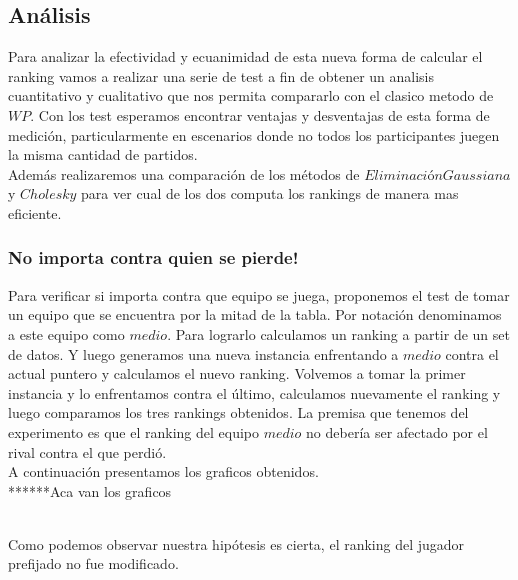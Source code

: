 \subsection{Análisis}

Para analizar la efectividad y ecuanimidad de esta nueva forma de calcular el ranking vamos a realizar una serie de test a fin de obtener un analisis cuantitativo y cualitativo que nos permita compararlo con el clasico metodo de $WP$.
Con los test esperamos encontrar ventajas y desventajas de esta forma de medición, particularmente en escenarios donde no todos los participantes juegen la misma cantidad de partidos.
\\
Además realizaremos una comparación de los métodos de $Eliminación Gaussiana$ y $Cholesky$ para ver cual de los dos computa los rankings de manera mas eficiente.


\subsubsection{No importa contra quien se pierde!}

Para verificar si importa contra que equipo se juega, proponemos el test de tomar un equipo que se encuentra por la mitad de la tabla. Por notación denominamos a este equipo como $medio$.
Para lograrlo calculamos un ranking a partir de un set de datos. Y luego generamos una nueva instancia enfrentando a $medio$ contra el actual puntero y calculamos el nuevo ranking. Volvemos a tomar la primer instancia y lo enfrentamos contra el último, calculamos nuevamente el ranking y luego 
comparamos los tres rankings obtenidos. La premisa que tenemos del experimento es que el ranking del equipo $medio$ no debería ser afectado por el rival contra el que perdió.
\\
A continuación presentamos los graficos obtenidos.
\\


******Aca van los graficos

\\


Como podemos observar nuestra hipótesis es cierta, el ranking del jugador prefijado no fue modificado.